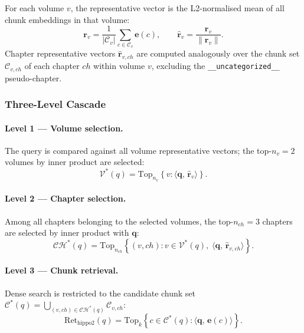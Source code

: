\documentclass[twocolumn]{article}
\begin{document}
For each volume $v$, the representative vector is the L2-normalised mean of
all chunk embeddings in that volume:
\begin{equation}
  \mathbf{r}_v = \frac{1}{|\mathcal{C}_v|}
    \sum_{c \in \mathcal{C}_v} \mathbf{e}(c),
  \qquad
  \hat{\mathbf{r}}_v = \frac{\mathbf{r}_v}{\|\mathbf{r}_v\|}.
  \label{eq:vol_rep}
\end{equation}
Chapter representative vectors $\hat{\mathbf{r}}_{v,ch}$ are computed analogously
over the chunk set $\mathcal{C}_{v,ch}$ of each chapter $ch$ within volume $v$,
excluding the \texttt{\_\_uncategorized\_\_} pseudo-chapter.

\subsubsection{Three-Level Cascade}

\paragraph{Level 1 --- Volume selection.}
The query is compared against all volume representative vectors;
the top-$n_v = 2$ volumes by inner product are selected:
\begin{equation}
  \mathcal{V}^*(q)
  = \mathrm{Top}_{n_v}\!\left\{v :
    \langle \mathbf{q},\, \hat{\mathbf{r}}_v \rangle \right\}.
  \label{eq:level1}
\end{equation}

\paragraph{Level 2 --- Chapter selection.}
Among all chapters belonging to the selected volumes,
the top-$n_{ch} = 3$ chapters are selected by inner product with $\mathbf{q}$:
\begin{equation}
  \mathcal{CH}^*(q)
  = \mathrm{Top}_{n_{ch}}\!\left\{(v,ch) :
    v \in \mathcal{V}^*(q),\;
    \langle \mathbf{q},\, \hat{\mathbf{r}}_{v,ch} \rangle \right\}.
  \label{eq:level2}
\end{equation}

\paragraph{Level 3 --- Chunk retrieval.}
Dense search is restricted to the candidate chunk set
$\mathcal{C}^*(q) = \bigcup_{(v,ch) \in \mathcal{CH}^*(q)} \mathcal{C}_{v,ch}$:
\begin{equation}
  \mathrm{Ret}_{\mathrm{hippo2}}(q)
  = \mathrm{Top}_k\!\left\{c \in \mathcal{C}^*(q) :
    \langle \mathbf{q},\, \mathbf{e}(c) \rangle \right\}.
  \label{eq:level3}
\end{equation}
\end{document}
